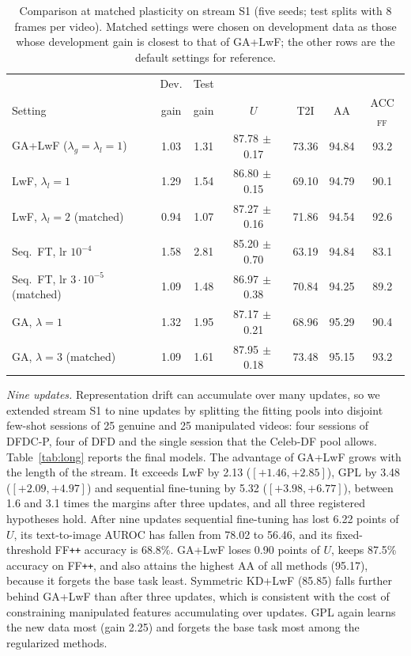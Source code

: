 \documentclass[journal]{IEEEtran}
\newcommand{\ffpp}{FF\texttt{++}}
\begin{document}
\begin{table}[t]
\caption{Comparison at matched plasticity on stream S1 (five seeds; test splits with 8 frames per video). Matched settings were chosen on development data as those whose development gain is closest to that of GA+LwF; the other rows are the default settings for reference.}
\label{tab:matched}
\centering
\footnotesize
\setlength{\tabcolsep}{1.7pt}
\begin{tabular}{@{}lcccccc@{}}
\toprule
& Dev. & Test & & & & \\
Setting & gain & gain & $U$ & T2I & AA & ACC$_{\mathrm{FF}}$ \\
\midrule
GA+LwF ($\lambda_g=\lambda_l=1$) & 1.03 & 1.31 & 87.78{\tiny$\,\pm$0.17} & 73.36 & 94.84 & 93.2 \\
LwF, $\lambda_l=1$ & 1.29 & 1.54 & 86.80{\tiny$\,\pm$0.15} & 69.10 & 94.79 & 90.1 \\
LwF, $\lambda_l=2$ (matched) & 0.94 & 1.07 & 87.27{\tiny$\,\pm$0.16} & 71.86 & 94.54 & 92.6 \\
Seq.\ FT, lr $10^{-4}$ & 1.58 & 2.81 & 85.20{\tiny$\,\pm$0.70} & 63.19 & 94.84 & 83.1 \\
Seq.\ FT, lr $3{\cdot}10^{-5}$ (matched) & 1.09 & 1.48 & 86.97{\tiny$\,\pm$0.38} & 70.84 & 94.25 & 89.2 \\
GA, $\lambda=1$ & 1.32 & 1.95 & 87.17{\tiny$\,\pm$0.21} & 68.96 & 95.29 & 90.4 \\
GA, $\lambda=3$ (matched) & 1.09 & 1.61 & 87.95{\tiny$\,\pm$0.18} & 73.48 & 95.15 & 93.2 \\
\bottomrule
\end{tabular}
\end{table}

\textit{Nine updates.}\label{sec:long} Representation drift can accumulate over many updates, so we extended stream S1 to nine updates by splitting the fitting pools into disjoint few-shot sessions of 25 genuine and 25 manipulated videos: four sessions of DFDC-P, four of DFD and the single session that the Celeb-DF pool allows. Table~\ref{tab:long} reports the final models. The advantage of GA+LwF grows with the length of the stream. It exceeds LwF by 2.13 ($[+1.46,+2.85]$), GPL by 3.48 ($[+2.09,+4.97]$) and sequential fine-tuning by 5.32 ($[+3.98,+6.77]$), between 1.6 and 3.1 times the margins after three updates, and all three registered hypotheses hold. After nine updates sequential fine-tuning has lost 6.22 points of $U$, its text-to-image AUROC has fallen from 78.02 to 56.46, and its fixed-threshold \ffpp{} accuracy is 68.8\%. GA+LwF loses 0.90 points of $U$, keeps 87.5\% accuracy on \ffpp{}, and also attains the highest AA of all methods (95.17), because it forgets the base task least. Symmetric KD+LwF (85.85) falls further behind GA+LwF than after three updates, which is consistent with the cost of constraining manipulated features accumulating over updates. GPL again learns the new data most (gain 2.25) and forgets the base task most among the regularized methods.
\end{document}
